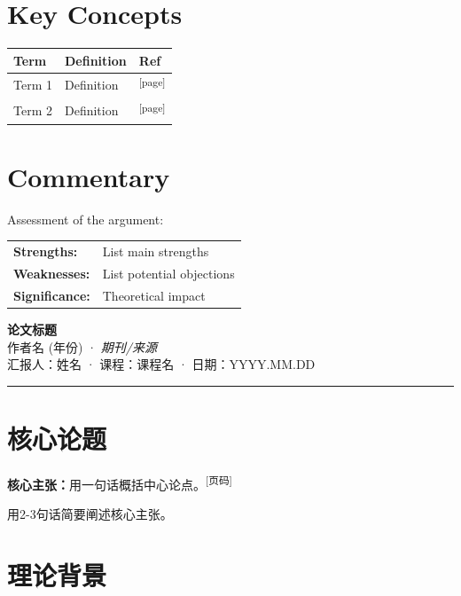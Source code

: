 \documentclass[10pt, a4paper]{article}
\newcommand{\pagemark}[1]{\textsuperscript{\scriptsize[#1]}}
\begin{document}
\section*{Key Concepts}

\begin{center}
\begin{tabular}{@{}lll@{}}
\toprule
\textbf{Term} & \textbf{Definition} & \textbf{Ref} \\
\midrule
Term 1 & Definition & \pagemark{page} \\
Term 2 & Definition & \pagemark{page} \\
\bottomrule
\end{tabular}
\end{center}

\section*{Commentary}

Assessment of the argument:\\[0.3em]
\begin{tabular}{@{}p{3.5cm}p{10cm}@{}}
\textbf{Strengths:} & List main strengths \\[0.2em]
\textbf{Weaknesses:} & List potential objections \\[0.2em]
\textbf{Significance:} & Theoretical impact
\end{tabular}

\newpage


{\centering
  {\Large\bfseries\sffamily 论文标题}\\[3pt]
  {\normalsize 作者名 (年份) · \textit{期刊/来源}}\\[4pt]
  汇报人：姓名 · 课程：课程名 · 日期：YYYY.MM.DD\par
}

\vspace{0.3em}
\hrule
\vspace{0.5em}

\section*{核心论题}

\textbf{核心主张：}用一句话概括中心论点。\pagemark{页码}

用2-3句话简要阐述核心主张。

\section*{理论背景}
\end{document}
